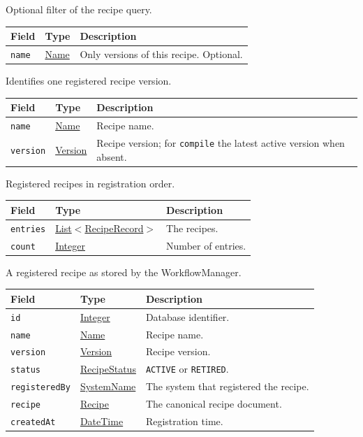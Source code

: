 \documentclass[a4paper]{arrowhead}
\newcommand{\mref}[1]{{\textcolor{ArrowheadPurple}{\hyperref[sec:model:#1]{#1}}}}
\newcommand{\pref}[1]{{\textcolor{ArrowheadGrey}{\hyperref[sec:model:primitives:#1]{#1}}}}
\begin{document}
Optional filter of the recipe query.

{\small
\begin{longtable}{|p{3.9cm}|p{4.4cm}|p{7.5cm}|}

\hline
\rowcolor{gray!33} Field & Type & Description \\ \hline
\endhead
\texttt{name} & \pref{Name} & Only versions of this recipe. Optional. \\ \hline
\end{longtable}
}

Identifies one registered recipe version.

{\small
\begin{longtable}{|p{3.9cm}|p{4.4cm}|p{7.5cm}|}

\hline
\rowcolor{gray!33} Field & Type & Description \\ \hline
\endhead
\texttt{name} & \pref{Name} & Recipe name. \\ \hline
\texttt{version} & \pref{Version} & Recipe version; for \texttt{compile} the latest active version when absent. \\ \hline
\end{longtable}
}

Registered recipes in registration order.

{\small
\begin{longtable}{|p{3.9cm}|p{4.4cm}|p{7.5cm}|}

\hline
\rowcolor{gray!33} Field & Type & Description \\ \hline
\endhead
\texttt{entries} & \pref{List}$<$\mref{RecipeRecord}$>$ & The recipes. \\ \hline
\texttt{count} & \pref{Integer} & Number of entries. \\ \hline
\end{longtable}
}

A registered recipe as stored by the WorkflowManager.

{\small
\begin{longtable}{|p{3.9cm}|p{4.4cm}|p{7.5cm}|}

\hline
\rowcolor{gray!33} Field & Type & Description \\ \hline
\endhead
\texttt{id} & \pref{Integer} & Database identifier. \\ \hline
\texttt{name} & \pref{Name} & Recipe name. \\ \hline
\texttt{version} & \pref{Version} & Recipe version. \\ \hline
\texttt{status} & \mref{RecipeStatus} & \texttt{ACTIVE} or \texttt{RETIRED}. \\ \hline
\texttt{registeredBy} & \pref{SystemName} & The system that registered the recipe. \\ \hline
\texttt{recipe} & \mref{Recipe} & The canonical recipe document. \\ \hline
\texttt{createdAt} & \pref{DateTime} & Registration time. \\ \hline
\end{longtable}
}
\end{document}
